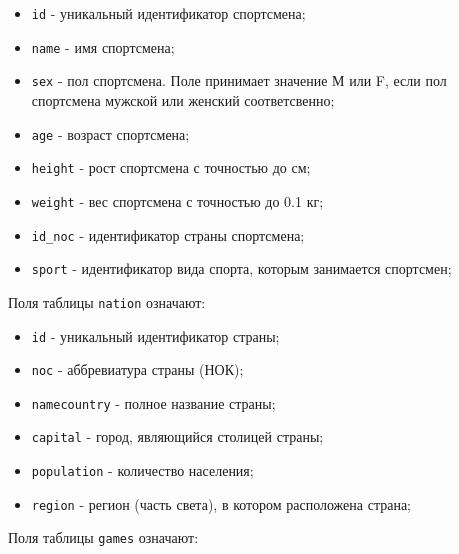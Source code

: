 \begin{itemize}
	
	\item  \texttt{id} - уникальный идентификатор спортсмена;
	
	\item  \texttt{name} - имя спортсмена;
	
	\item  \texttt{sex} - пол спортсмена. Поле принимает значение М или F, 
	если пол спортсмена мужской или женский соответсвенно;
	
	\item  \texttt{age} - возраст спортсмена;
	
	\item  \texttt{height} - рост спортсмена с точностью до см;
	
	\item  \texttt{weight} - вес спортсмена с точностью до 0.1 кг;
	
	\item  \texttt{id\_noc} - идентификатор страны спортсмена;
	
	\item  \texttt{sport} - идентификатор вида спорта, которым занимается спортсмен;
	
\end{itemize}


Поля таблицы \texttt{nation} означают:

\begin{itemize}
	
	\item  \texttt{id} - уникальный идентификатор страны;
	
	\item  \texttt{noc} - аббревиатура страны (НОК);
	
	\item  \texttt{namecountry} - полное название страны;
	
	\item  \texttt{capital} - город, являющийся столицей страны;
	
	\item  \texttt{population} - количество населения;
	
	\item  \texttt{region} - регион (часть света), в котором расположена страна;
	
\end{itemize}


Поля таблицы \texttt{games} означают:

